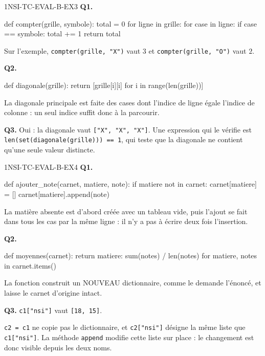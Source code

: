 \begin{corrige}{1NSI-TC-EVAL-B-EX3}
\textbf{Q1.}
\begin{python}
def compter(grille, symbole):
    total = 0
    for ligne in grille:
        for case in ligne:
            if case == symbole:
                total += 1
    return total
\end{python}
Sur l'exemple, \lstinline{compter(grille, "X")} vaut $3$ et \lstinline{compter(grille, "O")} vaut $2$.

\textbf{Q2.}
\begin{python}
def diagonale(grille):
    return [grille[i][i] for i in range(len(grille))]
\end{python}
La diagonale principale est faite des cases dont l'indice de ligne égale l'indice de colonne : un seul indice suffit donc à la parcourir.

\textbf{Q3.} Oui : la diagonale vaut \lstinline{["X", "X", "X"]}. Une expression qui le vérifie est
\lstinline{len(set(diagonale(grille))) == 1}, qui teste que la diagonale ne contient qu'une seule valeur distincte.
\end{corrige}

\begin{corrige}{1NSI-TC-EVAL-B-EX4}
\textbf{Q1.}
\begin{python}
def ajouter_note(carnet, matiere, note):
    if matiere not in carnet:
        carnet[matiere] = []
    carnet[matiere].append(note)
\end{python}
La matière absente est d'abord créée avec un tableau vide, puis l'ajout se fait dans tous les cas par la même ligne : il n'y a pas à écrire deux fois l'insertion.

\textbf{Q2.}
\begin{python}
def moyennes(carnet):
    return {matiere: sum(notes) / len(notes) for matiere, notes in carnet.items()}
\end{python}
La fonction construit un NOUVEAU dictionnaire, comme le demande l'énoncé, et laisse le carnet d'origine intact.

\textbf{Q3.} \lstinline{c1["nsi"]} vaut \lstinline{[18, 15]}.

\lstinline{c2 = c1} ne copie pas le dictionnaire, et \lstinline{c2["nsi"]} désigne la même liste que \lstinline{c1["nsi"]}. La méthode \lstinline{append} modifie cette liste sur place : le changement est donc visible depuis les deux noms.
\end{corrige}
